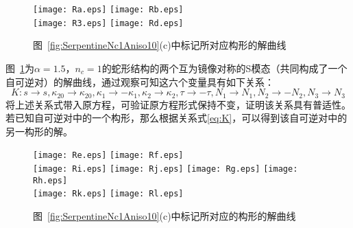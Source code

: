 \begin{figure}
	\centering
	{\texttt{[image: Ra.eps]}}
	{\texttt{[image: Rb.eps]}}\\
	{\texttt{[image: R3.eps]}}
	{\texttt{[image: Rd.eps]}}
	\caption{图~\ref{fig:SerpentineNc1Aniso10}(c)中标记所对应构形的解曲线}
	\label{fig:relation in reversible pair}
\end{figure}
图~\ref{fig:relation in reversible pair}为$\alpha=1.5$，$n_c=1$的蛇形结构的两个互为镜像对称的S模态（共同构成了一个自可逆对）的解曲线，通过观察可知这六个变量具有如下关系：
\begin{equation}
	K: s \rightarrow s, \kappa_{20} \rightarrow \kappa_{20}, \kappa_{1} \rightarrow-\kappa_{1}, \kappa_{2} \rightarrow \kappa_{2}, \tau \rightarrow-\tau, N_{1} \rightarrow N_{1}, N_{2} \rightarrow-N_{2}, N_{3} \rightarrow N_{3}
	\label{eq:K}
\end{equation}
将上述关系式带入原方程，可验证原方程形式保持不变，证明该关系具有普适性。若已知自可逆对中的一个构形，那么根据关系式\eqref{eq:K}，可以得到该自可逆对中的另一构形的解。
\begin{figure}
	\centering
	{\texttt{[image: Re.eps]}}
	{\texttt{[image: Rf.eps]}}\\
	{\texttt{[image: Ri.eps]}}
	{\texttt{[image: Rj.eps]}}
	{\texttt{[image: Rg.eps]}}
	{\texttt{[image: Rh.eps]}}\\
	{\texttt{[image: Rk.eps]}}
	{\texttt{[image: Rl.eps]}}
	\caption{图~\ref{fig:SerpentineNc1Aniso10}(c)中标记所对应的构形的解曲线}
	\label{fig:relation in reversible group}
\end{figure}
